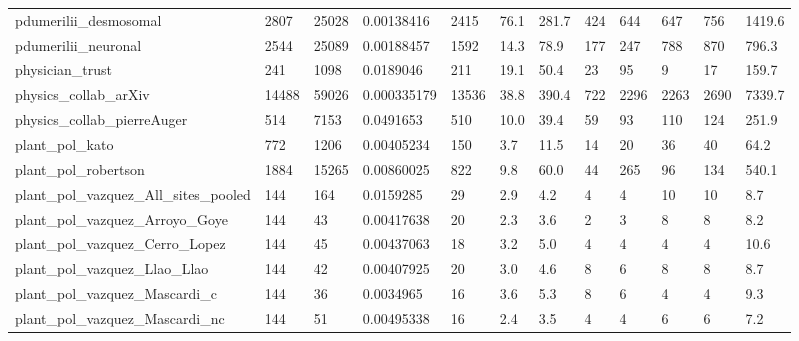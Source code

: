 \begin{longtable}{llllllllllll}
 pdumerilii\_desmosomal                              & 2807       & 25028     & 0.00138416  & 2415  & 76.1   & 281.7  & 424   & 644    & 647    & 756    & 1419.6  \\
 pdumerilii\_neuronal                                & 2544       & 25089     & 0.00188457  & 1592  & 14.3   & 78.9   & 177   & 247    & 788    & 870    & 796.3   \\
 physician\_trust                                    & 241        & 1098      & 0.0189046   & 211   & 19.1   & 50.4   & 23    & 95     & 9      & 17     & 159.7   \\
 physics\_collab\_arXiv                               & 14488      & 59026     & 0.000335179 & 13536 & 38.8   & 390.4  & 722   & 2296   & 2263   & 2690   & 7339.7  \\
 physics\_collab\_pierreAuger                         & 514        & 7153      & 0.0491653   & 510   & 10.0   & 39.4   & 59    & 93     & 110    & 124    & 251.9   \\
 plant\_pol\_kato                                     & 772        & 1206      & 0.00405234  & 150   & 3.7    & 11.5   & 14    & 20     & 36     & 40     & 64.2    \\
 plant\_pol\_robertson                                & 1884       & 15265     & 0.00860025  & 822   & 9.8    & 60.0   & 44    & 265    & 96     & 134    & 540.1   \\
 plant\_pol\_vazquez\_All\_sites\_pooled                 & 144        & 164       & 0.0159285   & 29    & 2.9    & 4.2    & 4     & 4      & 10     & 10     & 8.7     \\
 plant\_pol\_vazquez\_Arroyo\_Goye                      & 144        & 43        & 0.00417638  & 20    & 2.3    & 3.6    & 2     & 3      & 8      & 8      & 8.2     \\
 plant\_pol\_vazquez\_Cerro\_Lopez                      & 144        & 45        & 0.00437063  & 18    & 3.2    & 5.0    & 4     & 4      & 4      & 4      & 10.6    \\
 plant\_pol\_vazquez\_Llao\_Llao                        & 144        & 42        & 0.00407925  & 20    & 3.0    & 4.6    & 8     & 6      & 8      & 8      & 8.7     \\
 plant\_pol\_vazquez\_Mascardi\_c                       & 144        & 36        & 0.0034965   & 16    & 3.6    & 5.3    & 8     & 6      & 4      & 4      & 9.3     \\
 plant\_pol\_vazquez\_Mascardi\_nc                      & 144        & 51        & 0.00495338  & 16    & 2.4    & 3.5    & 4     & 4      & 6      & 6      & 7.2     \\

\end{longtable}
